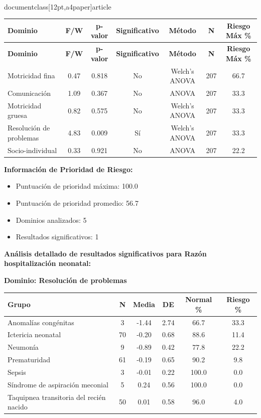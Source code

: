 \\documentclass[12pt,a4paper]{article}
\begin{document}
\begin{longtable}{|l|c|c|c|c|c|c|}
\hline
\textbf{Dominio} & \textbf{F/W} & \textbf{p-valor} & \textbf{Significativo} & \textbf{Método} & \textbf{N} & \textbf{Riesgo Máx \%} \\
\hline
\endfirsthead

\hline
\textbf{Dominio} & \textbf{F/W} & \textbf{p-valor} & \textbf{Significativo} & \textbf{Método} & \textbf{N} & \textbf{Riesgo Máx \%} \\
\hline
\endhead

\hline
\endfoot

\hline
\endlastfoot

Motricidad fina & 0.47 & 0.818 & No & Welch's ANOVA & 207 & 66.7 \\
Comunicación & 1.09 & 0.367 & No & ANOVA & 207 & 33.3 \\
Motricidad gruesa & 0.82 & 0.575 & No & Welch's ANOVA & 207 & 33.3 \\
Resolución de problemas & 4.83 & 0.009 & Sí & Welch's ANOVA & 207 & 33.3 \\
Socio-individual & 0.33 & 0.921 & No & ANOVA & 207 & 22.2 \\

\end{longtable}


\textbf{Información de Prioridad de Riesgo:}
\begin{itemize}
\item Puntuación de prioridad máxima: 100.0
\item Puntuación de prioridad promedio: 56.7
\item Dominios analizados: 5
\item Resultados significativos: 1
\end{itemize}


\textbf{Análisis detallado de resultados significativos para Razón hospitalización neonatal:}


\textbf{Dominio: Resolución de problemas}


\begin{center}
\begin{tabular}{|l|c|c|c|c|c|}
\hline
\textbf{Grupo} & \textbf{N} & \textbf{Media} & \textbf{DE} & \textbf{Normal \%} & \textbf{Riesgo \%} \\
\hline
Anomalías congénitas & 3 & -1.44 & 2.74 & 66.7 & 33.3 \\
Ictericia neonatal & 70 & -0.20 & 0.68 & 88.6 & 11.4 \\
Neumonía & 9 & -0.89 & 0.42 & 77.8 & 22.2 \\
Prematuridad & 61 & -0.19 & 0.65 & 90.2 & 9.8 \\
Sepsis & 3 & -0.01 & 0.22 & 100.0 & 0.0 \\
Síndrome de aspiración meconial & 5 & 0.24 & 0.56 & 100.0 & 0.0 \\
Taquipnea transitoria del recién nacido & 50 & 0.01 & 0.58 & 96.0 & 4.0 \\

\hline
\end{tabular}
\end{center}
\end{document}
